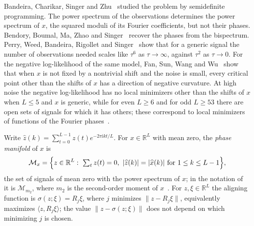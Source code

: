 \documentclass[11pt]{article}
\theoremstyle{remark}
\newcommand{\R}{\mathbb{R}}
\begin{document}
Bandeira, Charikar, Singer and Zhu~\cite{BCSZ14} studied the problem by semidefinite programming. The power spectrum of the observations determines the power spectrum of $x$, the squared moduli of its Fourier coefficients, but not their phases. Bendory, Boumal, Ma, Zhao and Singer~\cite{BBMZS18} recover the phases from the bispectrum. Perry, Weed, Bandeira, Rigollet and Singer~\cite{PWBRS19} show that for a generic signal the number of observations needed scales like $\tau^6$ as $\tau\to\infty$, against $\tau^2$ as $\tau\to0$. For the negative log-likelihood of the same model, Fan, Sun, Wang and Wu~\cite[Theorems~3.1 and~3.3]{FSWW23} show that when $x$ is not fixed by a nontrivial shift and the noise is small, every critical point other than the shifts of $x$ has a direction of negative curvature. At high noise the negative log-likelihood has no local minimizers other than the shifts of $x$ when $L\le5$ and $x$ is generic, while for even $L\ge6$ and for odd $L\ge53$ there are open sets of signals for which it has others; these correspond to local minimizers of functions of the Fourier phases~\cite[Theorem~4.28 and Corollary~4.30]{FSWW23}.

Write $\widehat z(k)=\sum_{t=0}^{L-1}z(t)e^{-2\pi\mathrm{i}kt/L}$. For $x\in\R^L$ with mean zero, the \emph{phase manifold} of $x$ is
\[
\mathcal M_x=\Bigl\{z\in\R^L:\ \textstyle\sum_t z(t)=0,\ |\widehat z(k)|=|\widehat x(k)|\text{ for }1\le k\le L-1\Bigr\},
\]
the set of signals of mean zero with the power spectrum of $x$; in the notation of~\cite[(2.4)]{SSA24} it is $\mathcal M_{m_2}$, where $m_2$ is the second-order moment of $x$~\cite[(2.2)]{SSA24}. For $z,\xi\in\R^L$ the aligning function is $\sigma(z;\xi)=R_{j}\xi$, where $j$ minimizes $\|z-R_j\xi\|$, equivalently maximizes $\langle z,R_j\xi\rangle$; the value $\|z-\sigma(z;\xi)\|$ does not depend on which minimizing $j$ is chosen.
\end{document}

